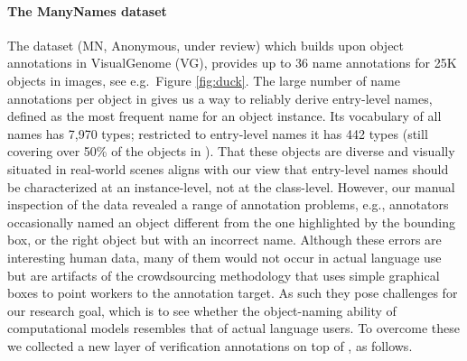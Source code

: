 \paragraph{The ManyNames dataset}
The \mn dataset (MN, Anonymous, under review) which builds upon object annotations in VisualGenome (VG), provides up to 36 name annotations for 25K objects in images, see e.g.\ Figure \ref{fig:duck}.
The large number of name annotations per object in \mn gives us a way to reliably derive entry-level names, defined as the most frequent name for an object instance.
Its vocabulary of all names has 7,970 types; restricted to entry-level names it has 442 types (still covering over 50\% of the objects in \vg).
That these objects are diverse and visually situated in real-world scenes aligns with our view that entry-level names should be characterized at an instance-level, not at the class-level.
However, our manual inspection of the \mn data revealed a range of annotation problems, e.g., annotators occasionally named an object different from the one highlighted by the bounding box, or the right object but with an incorrect name.
Although these errors are interesting human data, many of them would not occur in actual language use but are artifacts of the crowdsourcing methodology that uses simple graphical boxes to point workers to the annotation target.
As such they pose challenges for our research goal, which is to see whether the object-naming ability of computational models resembles that of actual language users.
To overcome these we collected a new layer of verification annotations on top of \mn, as follows.

